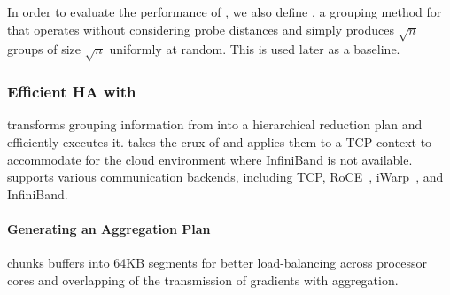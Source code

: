 
In order to evaluate the performance of \marcopolo, we also define \strongrandom, a grouping method for \mlha that operates without considering probe distances and simply produces $\sqrt{n}$ groups of size $\sqrt{n}$ uniformly at random. This is used later as a baseline.

\subsubsection{Efficient HA with \ha}
\label{sec:haimpl}
\ha transforms grouping information from \marcopolo into a hierarchical reduction plan and efficiently executes it. \ha takes the crux of \phub and applies them to a TCP context to accommodate for the cloud environment where InfiniBand is not available.
\ha supports various communication backends, including TCP, RoCE~\cite{softroce}, iWarp~\cite{softiwarp}, and InfiniBand.


\paragraph{Generating an Aggregation Plan}
\label{sec:generatingAggregationPlan}
\ha chunks buffers into 64KB segments for better load-balancing across processor cores and overlapping of the transmission of gradients with aggregation. %



